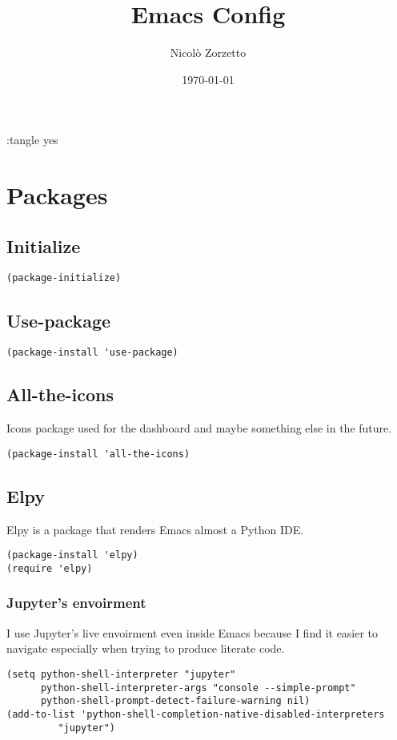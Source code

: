 \documentclass[11pt]{article}
\author{Nicolò Zorzetto}
\date{\today}
\title{Emacs Config}
\begin{document}
\maketitle
\tableofcontents

:tangle yes

\section{Packages}
\label{sec:orgd4c3b42}
\subsection{Initialize}
\label{sec:org3572826}
\begin{verbatim}
(package-initialize)
\end{verbatim}
\subsection{Use-package}
\label{sec:orgfbd9af5}
\begin{verbatim}
(package-install 'use-package)
\end{verbatim}

\subsection{All-the-icons}
\label{sec:org5ab706d}
Icons package used for the dashboard and maybe something else in the future.
\begin{verbatim}
(package-install 'all-the-icons)
\end{verbatim}

\subsection{Elpy}
\label{sec:org15200bb}
Elpy is a package that renders Emacs almost a Python IDE.
\begin{verbatim}
(package-install 'elpy)
(require 'elpy)
\end{verbatim}
\subsubsection{Jupyter's envoirment}
\label{sec:orgafcff84}
I use Jupyter's live envoirment even inside Emacs because I find it easier to navigate especially when trying to produce literate code.
\begin{verbatim}
(setq python-shell-interpreter "jupyter"
      python-shell-interpreter-args "console --simple-prompt"
      python-shell-prompt-detect-failure-warning nil)
(add-to-list 'python-shell-completion-native-disabled-interpreters
	     "jupyter")
\end{verbatim}
\end{document}
